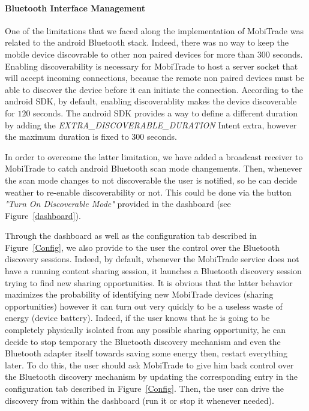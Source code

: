 \paragraph{Bluetooth Interface Management}

One of the limitations that we faced along the implementation of MobiTrade was related to the android Bluetooth stack. Indeed, there
was no way to keep the mobile device discovrable to other non paired devices for more than 300 seconds. Enabling discoverability is necessary for MobiTrade to host a server socket that will accept incoming connections, because the remote non paired devices must be able to discover the device before it can initiate the connection. According to the android SDK, by default, enabling discoverablity makes the device discoverable for $120$ seconds. The android SDK provides a way to define a different duration by adding the \emph{EXTRA\_DISCOVERABLE\_DURATION} Intent extra, however the maximum duration is fixed to 300 seconds.

In order to overcome the latter limitation, we have added a broadcast receiver to MobiTrade to catch android Bluetooth scan mode changements. Then, whenever the scan mode changes to not discoverable the user is notified, so he can decide weather to re-enable discoverability or not. This could be done via the button \emph{"Turn On Discoverable Mode"} provided in the dashboard (see Figure~\ref{dashboard}).

Through the dashboard as well as the configuration tab described in Figure~\ref{Config}, we also provide to the user the control over the Bluetooth discovery sessions. Indeed, by default, whenever the MobiTrade service does not have a running content sharing session, it launches a Bluetooth discovery session trying to find new sharing opportunities. It is obvious that the latter behavior maximizes the probability of identifying new MobiTrade devices (sharing opportunities) however it can turn out very quickly to be a useless waste of energy (device battery). Indeed, if the user knows that he is going to be completely physically isolated from any possible sharing opportunity, he can decide to stop temporary the Bluetooth discovery mechanism and even the Bluetooth adapter itself towards saving some energy then, restart everything later. To do this, the user should ask MobiTrade to give him back control over the Bluetooth discovery mechanism by updating the corresponding entry in the configuration tab described in Figure~\ref{Config}. Then, the user can drive the discovery from within the dashboard (run it or stop it whenever needed).

